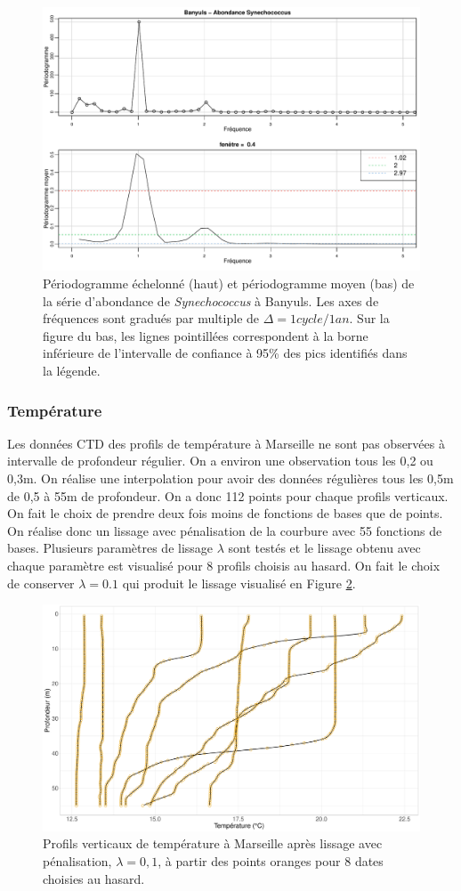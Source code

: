 \documentclass[12pt]{article}
\begin{document}
\begin{figure}
\centering
\includegraphics[width=.7\textwidth]{fig/R12_period_syn_banyuls.pdf}
\caption{Périodogramme échelonné (haut) et périodogramme moyen (bas) de la série d'abon\-dance de \textit{Synechococcus} à Banyuls. Les axes de fréquences sont gradués par multiple de $\Delta=1 cycle/1 an$. Sur la figure du bas, les lignes pointillées correspondent à la borne inférieure de l'intervalle de confiance à 95\% des pics identifiés dans la légende.}
\label{period}
\end{figure}


\subsubsection{Température}

Les données CTD des profils de température à Marseille ne sont pas observées à intervalle de profondeur régulier. On a environ une observation tous les 0,2 ou 0,3m. On réalise une interpolation pour avoir des données régulières tous les 0,5m de 0,5 à 55m de profondeur. On a donc 112 points pour chaque profils verticaux. On fait le choix de prendre deux fois moins de fonctions de bases que de points. On réalise donc un lissage avec pénalisation de la courbure avec 55 fonctions de bases. Plusieurs paramètres de lissage $\lambda$ sont testés et le lissage obtenu avec chaque paramètre est visualisé pour 8 profils choisis au hasard. On fait le choix de conserver $\lambda = 0.1$ qui produit le lissage visualisé en Figure \ref{lambda_ctd}. 

\begin{figure}
\centering
\includegraphics[width=.75\textwidth]{fig/R131_prof_lambda.pdf}
\caption{Profils verticaux de température à Marseille après lissage avec pénalisation, $\lambda=0,1$, à partir des points oranges pour 8 dates choisies au hasard.}
\label{lambda_ctd}
\end{figure}
\end{document}
